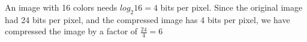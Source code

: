 \begin{answer}


An image with 16 colors needs $log_2 16 = 4$ bits per pixel. Since the original image had 24 bits per pixel, and the compressed image has 4 bits per pixel, we have compressed the image by a factor of $\frac{24}{4} = 6$
\end{answer}
